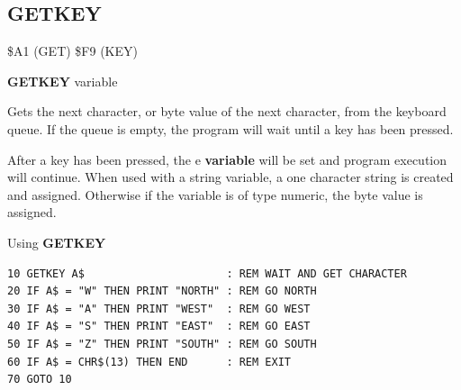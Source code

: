 \subsection{GETKEY}
\begin{description}[leftmargin=2cm,style=nextline]
\item [Token:]    \$A1 (GET) \$F9 (KEY)

\item [Format:]   {\bf GETKEY} variable

\item [Usage:]    Gets the next character, or byte value of the next character, from the keyboard queue. If the queue is empty, the program will wait until a key has been pressed.

                  After a key has been pressed, the e {\bf variable} will be set and program execution will continue. When used with a string variable, a one character string is created and assigned. Otherwise if the variable is of type numeric, the byte value is assigned.

\item [Example:]  Using {\bf GETKEY}

\begin{tcolorbox}[colback=black,coltext=white]
\verbatimfont{\codefont}
\begin{verbatim}
10 GETKEY A$                      : REM WAIT AND GET CHARACTER
20 IF A$ = "W" THEN PRINT "NORTH" : REM GO NORTH
30 IF A$ = "A" THEN PRINT "WEST"  : REM GO WEST
40 IF A$ = "S" THEN PRINT "EAST"  : REM GO EAST
50 IF A$ = "Z" THEN PRINT "SOUTH" : REM GO SOUTH
60 IF A$ = CHR$(13) THEN END      : REM EXIT
70 GOTO 10
\end{verbatim}
\end{tcolorbox}
\end{description}


\newpage

